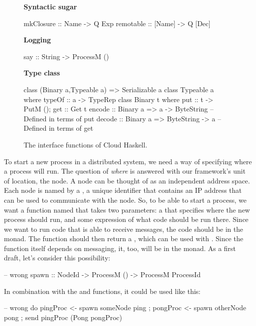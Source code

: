 \documentclass[preprint]{sigplanconf}
\begin{document}
\begin{figure}[t!]
 \textbf{Syntactic sugar}
\begin{code}
mkClosure :: Name   -> Q Exp
remotable :: [Name] -> Q [Dec]
\end{code}

 \textbf{Logging}
\begin{code}
say :: String -> ProcessM ()
\end{code}

 \textbf{Type class}
\begin{code}
class (Binary a,Typeable a) => Serializable a
class Typeable a where typeOf :: a -> TypeRep
class Binary t where { put :: t -> PutM (); get :: Get t }
encode :: Binary a => a -> ByteString
  -- Defined in terms of put
decode :: Binary a => ByteString -> a
  -- Defined in terms of get
\end{code}
\caption{The interface functions of Cloud Haskell.%
\label{fig:api}}
\end{figure}


To start a new process in a distributed system, we need a way of specifying where a process will run. The question of {\em where} is answered with our framework's unit of location, the node. A node can be thought of as an independent address space. Each node is named by a , a unique identifier that contains an IP address that can be used to communicate with the node. So, to be able to start a process, we want a function named  that takes two parameters: a  that specifies where the new process should run, and some expression of what code should be run there. Since we want to run code that is able to receive messages, the code should be in the  monad. The  function should then return a , which can be used with .  Since the  function itself depends on messaging, it, too, will be in the  monad. As a first draft, let's consider this possibility:

\begin{code}
-- wrong
spawn :: NodeId -> ProcessM () -> ProcessM ProcessId
\end{code}

In combination with the  and  functions, it could be used like this:

\begin{code}
-- wrong
do { pingProc <- spawn someNode ping
   ; pongProc <- spawn otherNode pong
   ; send pingProc (Pong pongProc) }
\end{code}
\end{document}
